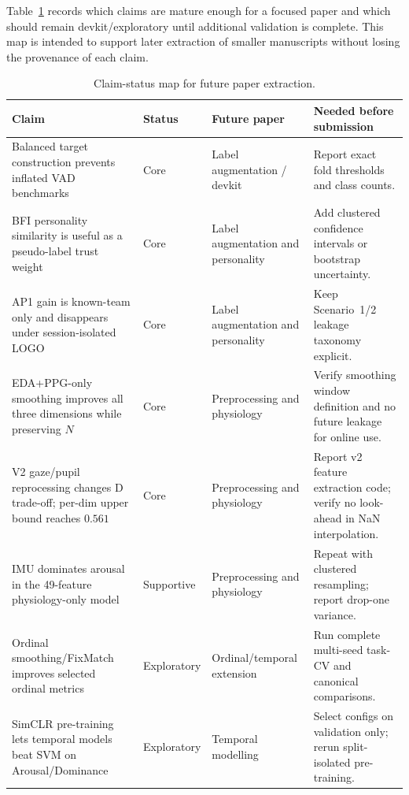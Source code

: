 \documentclass[sigconf,nonacm]{acmart}
\begin{document}
Table~\ref{tab:extraction_map} records which claims are mature enough for a
focused paper and which should remain devkit/exploratory until additional
validation is complete.
This map is intended to support later extraction of smaller manuscripts without
losing the provenance of each claim.

\begin{table}[t]
\caption{Claim-status map for future paper extraction.}
\label{tab:extraction_map}
\centering
\setlength{\tabcolsep}{4pt}
\small
\begin{tabular}{p{}p{}p{}p{}}
\toprule
\textbf{Claim} & \textbf{Status} & \textbf{Future paper} & \textbf{Needed before submission} \\
\midrule
Balanced target construction prevents inflated VAD benchmarks &
Core &
Label augmentation / devkit &
Report exact fold thresholds and class counts. \\
\addlinespace
BFI personality similarity is useful as a pseudo-label trust weight &
Core &
Label augmentation and personality &
Add clustered confidence intervals or bootstrap uncertainty. \\
\addlinespace
AP1 gain is known-team only and disappears under session-isolated LOGO &
Core &
Label augmentation and personality &
Keep Scenario~1/2 leakage taxonomy explicit. \\
\addlinespace
EDA+PPG-only smoothing improves all three dimensions while preserving $N$ &
Core &
Preprocessing and physiology &
Verify smoothing window definition and no future leakage for online use. \\
\addlinespace
V2 gaze/pupil reprocessing changes D trade-off; per-dim upper bound reaches $0.561$ &
Core &
Preprocessing and physiology &
Report v2 feature extraction code; verify no look-ahead in NaN interpolation. \\
\addlinespace
IMU dominates arousal in the 49-feature physiology-only model &
Supportive &
Preprocessing and physiology &
Repeat with clustered resampling; report drop-one variance. \\
\addlinespace
Ordinal smoothing/FixMatch improves selected ordinal metrics &
Exploratory &
Ordinal/temporal extension &
Run complete multi-seed task-CV and canonical comparisons. \\
\addlinespace
SimCLR pre-training lets temporal models beat SVM on Arousal/Dominance &
Exploratory &
Temporal modelling &
Select configs on validation only; rerun split-isolated pre-training. \\
\bottomrule
\end{tabular}
\end{table}
\end{document}

